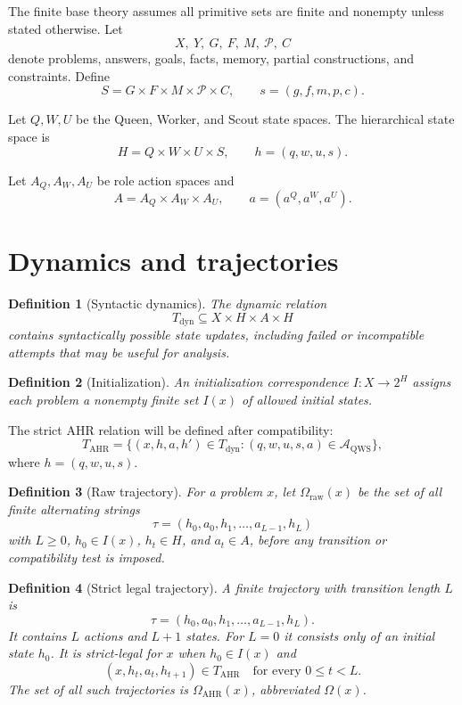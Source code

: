 \documentclass[11pt,oneside]{book}
\newtheorem{definition}{Definition}[chapter]
\theoremstyle{remark}
\newcommand{\AQWS}{\mathcal A_{\mathrm{QWS}}}
\newcommand{\Om}{\Omega}
\begin{document}
The finite base theory assumes all primitive sets are finite and nonempty unless stated otherwise. Let
\[
X,\ Y,\ G,\ F,\ M,\ \mathcal P,\ C
\]
denote problems, answers, goals, facts, memory, partial constructions, and constraints. Define
\[
S=G\times F\times M\times\mathcal P\times C,
\qquad s=(g,f,m,p,c).
\]

Let $Q,W,U$ be the Queen, Worker, and Scout state spaces. The hierarchical state space is
\[
H=Q\times W\times U\times S,
\qquad h=(q,w,u,s).
\]

Let $A_Q,A_W,A_U$ be role action spaces and
\[
A=A_Q\times A_W\times A_U,
\qquad a=(a^Q,a^W,a^U).
\]

\section{Dynamics and trajectories}

\begin{definition}[Syntactic dynamics]
The dynamic relation
\[
T_{\mathrm{dyn}}\subseteq X\times H\times A\times H
\]
contains syntactically possible state updates, including failed or incompatible attempts that may be useful for analysis.
\end{definition}

\begin{definition}[Initialization]
An initialization correspondence $I:X\to 2^H$ assigns each problem a nonempty finite set $I(x)$ of allowed initial states.
\end{definition}

The strict AHR relation will be defined after compatibility:
\[
T_{\mathrm{AHR}}
=\{(x,h,a,h')\in T_{\mathrm{dyn}}:(q,w,u,s,a)\in\AQWS\},
\]
where $h=(q,w,u,s)$.

\begin{definition}[Raw trajectory]
For a problem $x$, let $\Om_{\mathrm{raw}}(x)$ be the set of all finite
alternating strings
\[
\tau=(h_0,a_0,h_1,\ldots,a_{L-1},h_L)
\]
with $L\ge0$, $h_0\in I(x)$, $h_t\in H$, and $a_t\in A$, before any transition
or compatibility test is imposed.
\end{definition}

\begin{definition}[Strict legal trajectory]
A finite trajectory with transition length $L$ is
\[
\tau=(h_0,a_0,h_1,\ldots,a_{L-1},h_L).
\]
It contains $L$ actions and $L+1$ states. For $L=0$ it consists only of an
initial state $h_0$.
It is strict-legal for $x$ when $h_0\in I(x)$ and
\[
(x,h_t,a_t,h_{t+1})\in T_{\mathrm{AHR}}
\quad\text{for every }0\le t<L.
\]
The set of all such trajectories is $\Om_{\mathrm{AHR}}(x)$, abbreviated $\Om(x)$.
\end{definition}
\end{document}
